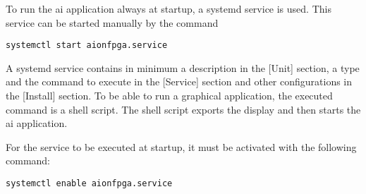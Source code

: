 To run the \acrshort{ai} application always at startup, a systemd service is used.
This service can be started manually by the command
\begin{lstlisting}[style=bash, caption={}, label=lst:start_service]
  systemctl start aionfpga.service
\end{lstlisting}
A systemd service contains in minimum a description in the [Unit] section, a type and the command to execute in the [Service] section and other configurations in the [Install] section.
To be able to run a graphical application, the executed command is a shell script.
The shell script exports the display and then starts the \acrshort{ai} application.

For the service to be executed at startup, it must be activated with the following command:
\begin{lstlisting}[style=bash, caption={}, label=lst:start_service]
  systemctl enable aionfpga.service
\end{lstlisting}
